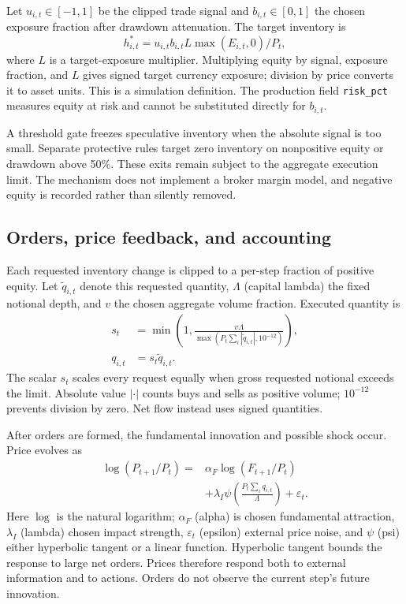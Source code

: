 Let $u_{i,t}\in[-1,1]$ be the clipped trade signal and $b_{i,t}\in[0,1]$ the chosen exposure fraction after drawdown attenuation. The target inventory is
\begin{equation}
 h^*_{i,t}=u_{i,t}b_{i,t}L\max(E_{i,t},0)/P_t,
\end{equation}
where $L$ is a target-exposure multiplier. Multiplying equity by signal, exposure fraction, and $L$ gives signed target currency exposure; division by price converts it to asset units. This is a simulation definition. The production field \texttt{risk\_pct} measures equity at risk and cannot be substituted directly for $b_{i,t}$.

A threshold gate freezes speculative inventory when the absolute signal is too small. Separate protective rules target zero inventory on nonpositive equity or drawdown above 50\%. These exits remain subject to the aggregate execution limit. The mechanism does not implement a broker margin model, and negative equity is recorded rather than silently removed.

\subsection{Orders, price feedback, and accounting}
Each requested inventory change is clipped to a per-step fraction of positive equity. Let $\widetilde q_{i,t}$ denote this requested quantity, $\Lambda$ (capital lambda) the fixed notional depth, and $v$ the chosen aggregate volume fraction. Executed quantity is
\begin{align}
 s_t&=\min\left(1,\frac{v\Lambda}{\max(P_t\sum_i|\widetilde q_{i,t}|,10^{-12})}\right),\\
 q_{i,t}&=s_t\widetilde q_{i,t}.
\end{align}
The scalar $s_t$ scales every request equally when gross requested notional exceeds the limit. Absolute value $|\cdot|$ counts buys and sells as positive volume; $10^{-12}$ prevents division by zero. Net flow instead uses signed quantities.

After orders are formed, the fundamental innovation and possible shock occur. Price evolves as
\begin{align}
 \log(P_{t+1}/P_t)={}&\alpha_F\log(F_{t+1}/P_t)\nonumber\\
 &+\lambda_I\psi\left(\frac{P_t\sum_iq_{i,t}}{\Lambda}\right)+\varepsilon_t.
\end{align}
Here $\log$ is the natural logarithm; $\alpha_F$ (alpha) is chosen fundamental attraction, $\lambda_I$ (lambda) chosen impact strength, $\varepsilon_t$ (epsilon) external price noise, and $\psi$ (psi) either hyperbolic tangent or a linear function. Hyperbolic tangent bounds the response to large net orders. Prices therefore respond both to external information and to actions. Orders do not observe the current step's future innovation.

